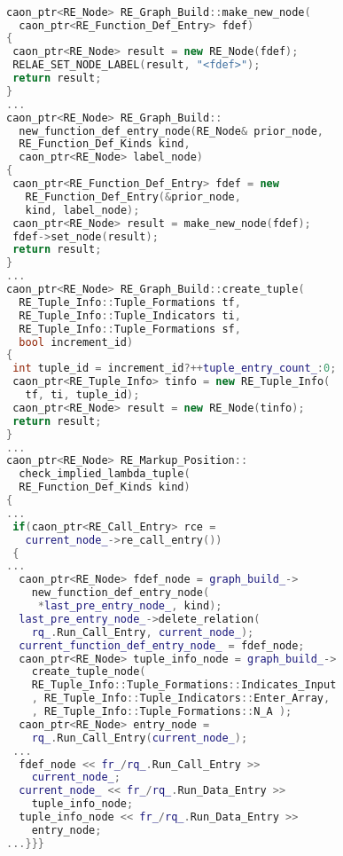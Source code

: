 \tmphs\begin{lstlisting}[caption={%
\emblink{\#lst--initializing-hypernodes--\thelstlisting.pgvm-pdf}{Initializing Hypernodes}},
  language = C++, numbers = none, escapechar = !, 
  label={lst:initializing-hypernodes},
    basicstyle = \ttfamily\bfseries\footnotesize, 
	linewidth = 1.01\linewidth]

caon_ptr<RE_Node> RE_Graph_Build::make_new_node(
  caon_ptr<RE_Function_Def_Entry> fdef)
{
 caon_ptr<RE_Node> result = new RE_Node(fdef);
 RELAE_SET_NODE_LABEL(result, "<fdef>");
 return result;
}
...
caon_ptr<RE_Node> RE_Graph_Build::
  new_function_def_entry_node(RE_Node& prior_node,
  RE_Function_Def_Kinds kind, 
  caon_ptr<RE_Node> label_node)
{
 caon_ptr<RE_Function_Def_Entry> fdef = new 
   RE_Function_Def_Entry(&prior_node, 
   kind, label_node);
 caon_ptr<RE_Node> result = make_new_node(fdef);
 fdef->set_node(result);
 return result;
}
...
caon_ptr<RE_Node> RE_Graph_Build::create_tuple(
  RE_Tuple_Info::Tuple_Formations tf,
  RE_Tuple_Info::Tuple_Indicators ti, 
  RE_Tuple_Info::Tuple_Formations sf, 
  bool increment_id)
{
 int tuple_id = increment_id?++tuple_entry_count_:0;
 caon_ptr<RE_Tuple_Info> tinfo = new RE_Tuple_Info(
   tf, ti, tuple_id);
 caon_ptr<RE_Node> result = new RE_Node(tinfo);
 return result;
}
...
caon_ptr<RE_Node> RE_Markup_Position::
  check_implied_lambda_tuple(
  RE_Function_Def_Kinds kind)
{
...
 if(caon_ptr<RE_Call_Entry> rce = 
   current_node_->re_call_entry())
 {
...
  caon_ptr<RE_Node> fdef_node = graph_build_->
    new_function_def_entry_node(
     *last_pre_entry_node_, kind);
  last_pre_entry_node_->delete_relation(
    rq_.Run_Call_Entry, current_node_);
  current_function_def_entry_node_ = fdef_node;
  caon_ptr<RE_Node> tuple_info_node = graph_build_->
    create_tuple_node(
    RE_Tuple_Info::Tuple_Formations::Indicates_Input
    , RE_Tuple_Info::Tuple_Indicators::Enter_Array, 
    , RE_Tuple_Info::Tuple_Formations::N_A );	
  caon_ptr<RE_Node> entry_node = 
    rq_.Run_Call_Entry(current_node_);
 ...
  fdef_node << fr_/rq_.Run_Call_Entry >> 
    current_node_;  
  current_node_ << fr_/rq_.Run_Data_Entry >> 
    tuple_info_node;
  tuple_info_node << fr_/rq_.Run_Data_Entry >> 
    entry_node;
...}}}
\end{lstlisting}


